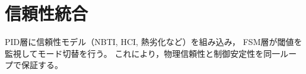 \section{信頼性統合}
PID層に信頼性モデル（NBTI, HCI, 熱劣化など）を組み込み，
FSM層が閾値を監視してモード切替を行う。
これにより，物理信頼性と制御安定性を同一ループで保証する。

